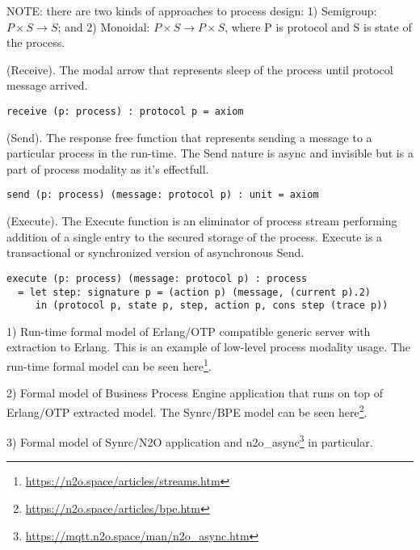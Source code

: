 NOTE: there are two kinds of approaches to process design:
1) Semigroup: $P \times S \rightarrow S$;
and 2) Monoidal: $P \times S \rightarrow P \times S$,
where P is protocol and S is state of the process.

\begin{definition} (Receive).
The modal arrow that represents
sleep of the process until protocol message arrived.
\begin{lstlisting}
receive (p: process) : protocol p = axiom
\end{lstlisting}
\end{definition}

\begin{definition} (Send).
The response free function that represents
sending a message to a particular process in the run-time. The Send
nature is async and invisible but is a part of process modality as
it's effectfull.
\begin{lstlisting}
send (p: process) (message: protocol p) : unit = axiom
\end{lstlisting}
\end{definition}

\begin{definition} (Execute).
The Execute function is an
eliminator of process stream performing addition of a single entry
to the secured storage of the process. Execute is a transactional
or synchronized version of asynchronous Send.
\begin{lstlisting}
execute (p: process) (message: protocol p) : process
  = let step: signature p = (action p) (message, (current p).2)
     in (protocol p, state p, step, action p, cons step (trace p))
\end{lstlisting}
\end{definition}

1) Run-time formal model
of Erlang/OTP compatible generic server with extraction to Erlang.
This is an example of low-level process modality usage.
The run-time formal model can be seen
here\footnote{\url{https://n2o.space/articles/streams.htm}}.

2) Formal model of Business Process Engine application that runs on top of Erlang/OTP
extracted model. The Synrc/BPE model can be seen
here\footnote{\url{https://n2o.space/articles/bpe.htm}}.

3) Formal model of Synrc/N2O application
and n2o\_async\footnote{\url{https://mqtt.n2o.space/man/n2o_async.htm}} in particular.

